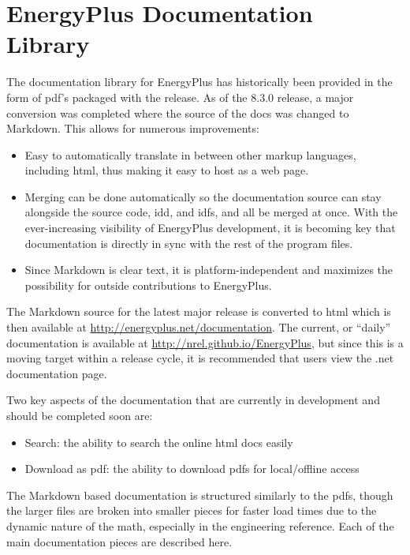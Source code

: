 \section{EnergyPlus Documentation Library}\label{energyplus-documentation-library}

The documentation library for EnergyPlus has historically been provided in the form of pdf's packaged with the release. As of the 8.3.0 release, a major conversion was completed where the source of the docs was changed to Markdown. This allows for numerous improvements:

\begin{itemize}
\tightlist
\item
  Easy to automatically translate in between other markup languages, including html, thus making it easy to host as a web page.
\item
  Merging can be done automatically so the documentation source can stay alongside the source code, idd, and idfs, and all be merged at once. With the ever-increasing visibility of EnergyPlus development, it is becoming key that documentation is directly in sync with the rest of the program files.
\item
  Since Markdown is clear text, it is platform-independent and maximizes the possibility for outside contributions to EnergyPlus.
\end{itemize}

The Markdown source for the latest major release is converted to html which is then available at \url{http://energyplus.net/documentation}. The current, or ``daily'' documentation is available at \url{http://nrel.github.io/EnergyPlus}, but since this is a moving target within a release cycle, it is recommended that users view the .net documentation page.

Two key aspects of the documentation that are currently in development and should be completed soon are:

\begin{itemize}
\tightlist
\item
  Search: the ability to search the online html docs easily
\item
  Download as pdf: the ability to download pdfs for local/offline access
\end{itemize}

The Markdown based documentation is structured similarly to the pdfs, though the larger files are broken into smaller pieces for faster load times due to the dynamic nature of the math, especially in the engineering reference. Each of the main documentation pieces are described here.

